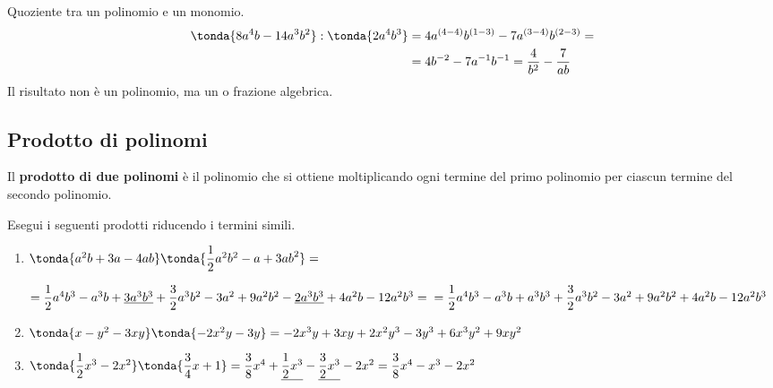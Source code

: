 \begin{esempio}{}{}
Quoziente tra un polinomio e un monomio.
\begin{align*}
\tonda{8a^{4}b-14a^{3}b^{2}}:\tonda{2a^{4}b^3} &= 
4a^{(4-4)}b^{(1-3)}-7a^{(3-4)}b^{(2-3)} = \\
& = 4b^{-2}-7a^{-1}b^{-1} = \frac{4}{b^2}-\frac{7}{ab}
\end{align*}
Il risultato non è un polinomio, ma un 
 o frazione algebrica.
\end{esempio}


\subsection{Prodotto di polinomi}
\label{subsec:poli_prodotto}

\begin{definizione}{}{}
Il \textbf{prodotto di due polinomi} è il
polinomio che si 
ottiene moltiplicando ogni termine del primo polinomio per ciascun 
termine del secondo polinomio.
\end{definizione}

\begin{esempio}{}{}
 Esegui i seguenti prodotti riducendo i termini simili.

\begin{enumerate} [left=0mm]
\item 
\(\tonda{a^{2}b+3a-4{ab}}\tonda{\dfrac{1}{2}a^{2}b^{2}-a+3{ab}^{2}}=\)

\(=\dfrac{1}{2}a^{4}b^{3}-a^{3}b+\underline{3a^{3}b^{3}}+
   \dfrac{3}{2}a^{3}b^{2}
-3a^{2}+9a^{2}b^{2} -\underline{2a^{3}b^{3}}+4a^{2}b-12a^{2}b^{3}=\newline
=\dfrac{1}{2}a^{4}b^{3}-a^{3}b+a^{3}b^{3}+
 \dfrac{3}{2}a^{3}b^{2}-3a^{2}+9a^{2}b^{2}+4a^{2}b-12a^{2}b^{3}\)
\item 
\(\tonda{x-y^{2}-3{xy}}\tonda{-2x^{2}y-3y}=-2x^{3}y+3{xy}+2x^{2}y^
{3}-3y^{3}+6x^{3}y^{2}+9{xy}^{2}\)
\item 
\(\tonda{\dfrac{1}{2}x^{3}-2x^{2}}\tonda{\dfrac{3}{4}x+1}=
\dfrac{3}{8}x^{4}+\underline{\dfrac{1}{2}x^{3}}-
 \underline{\dfrac{3}{2}x^{3}}-2x^{2}
=\dfrac{3}{8}x^{4}-x^{3}-2x^{2}\)
\end{enumerate}
\end{esempio}

